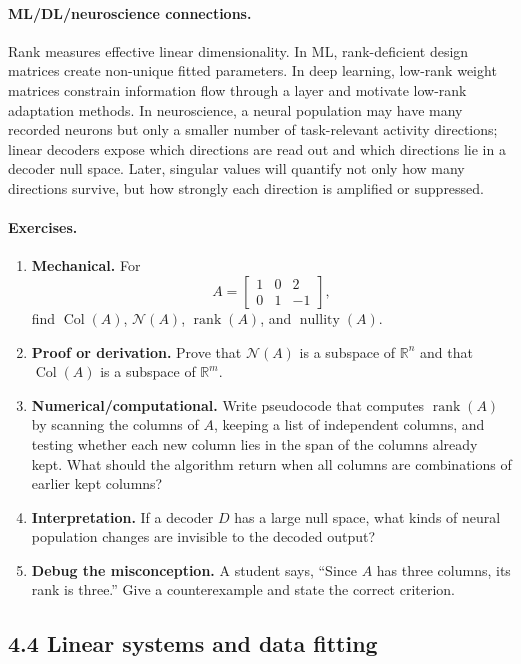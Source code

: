 \paragraph{ML/DL/neuroscience connections.}
Rank measures effective linear dimensionality. In ML, rank-deficient design matrices create non-unique fitted parameters. In deep learning, low-rank weight matrices constrain information flow through a layer and motivate low-rank adaptation methods. In neuroscience, a neural population may have many recorded neurons but only a smaller number of task-relevant activity directions; linear decoders expose which directions are read out and which directions lie in a decoder null space. Later, singular values will quantify not only how many directions survive, but how strongly each direction is amplified or suppressed.

\paragraph{Exercises.}
\begin{enumerate}[label=\textbf{4.3.\arabic*.}, leftmargin=*]
\item \textbf{Mechanical.} For
\[
A=\begin{bmatrix}1&0&2\\0&1&-1\end{bmatrix},
\]
find \(\operatorname{Col}(A)\), \(\mathcal{N}(A)\), \(\operatorname{rank}(A)\), and \(\operatorname{nullity}(A)\).
\item \textbf{Proof or derivation.} Prove that \(\mathcal{N}(A)\) is a subspace of \(\mathbb{R}^n\) and that \(\operatorname{Col}(A)\) is a subspace of \(\mathbb{R}^m\).
\item \textbf{Numerical/computational.} Write pseudocode that computes \(\operatorname{rank}(A)\) by scanning the columns of \(A\), keeping a list of independent columns, and testing whether each new column lies in the span of the columns already kept. What should the algorithm return when all columns are combinations of earlier kept columns?
\item \textbf{Interpretation.} If a decoder \(D\) has a large null space, what kinds of neural population changes are invisible to the decoded output?
\item \textbf{Debug the misconception.} A student says, ``Since \(A\) has three columns, its rank is three.'' Give a counterexample and state the correct criterion.
\end{enumerate}

\subsection{4.4 Linear systems and data fitting}

